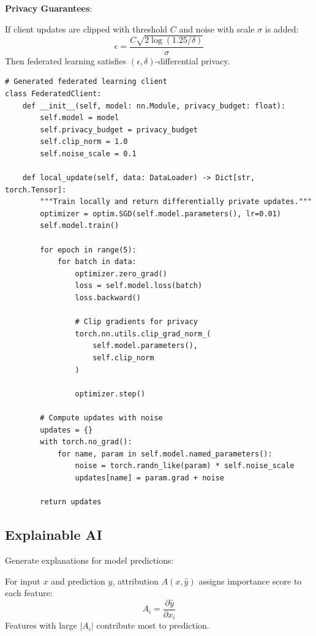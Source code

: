 \textbf{Privacy Guarantees}:

\begin{theorem}
    If client updates are clipped with threshold $C$ and noise with scale $\sigma$ is added:
    \begin{equation}
        \epsilon = \frac{C \sqrt{2 \log(1.25/\delta)}}{\sigma}
    \end{equation}
    Then federated learning satisfies $(\epsilon, \delta)$-differential privacy.
\end{theorem}

\begin{verbatim}
# Generated federated learning client
class FederatedClient:
    def __init__(self, model: nn.Module, privacy_budget: float):
        self.model = model
        self.privacy_budget = privacy_budget
        self.clip_norm = 1.0
        self.noise_scale = 0.1

    def local_update(self, data: DataLoader) -> Dict[str, torch.Tensor]:
        """Train locally and return differentially private updates."""
        optimizer = optim.SGD(self.model.parameters(), lr=0.01)
        self.model.train()

        for epoch in range(5):
            for batch in data:
                optimizer.zero_grad()
                loss = self.model.loss(batch)
                loss.backward()

                # Clip gradients for privacy
                torch.nn.utils.clip_grad_norm_(
                    self.model.parameters(),
                    self.clip_norm
                )

                optimizer.step()

        # Compute updates with noise
        updates = {}
        with torch.no_grad():
            for name, param in self.model.named_parameters():
                noise = torch.randn_like(param) * self.noise_scale
                updates[name] = param.grad + noise

        return updates
\end{verbatim}

\subsection{Explainable AI}

Generate explanations for model predictions:

\begin{definition}
    For input $x$ and prediction $\hat{y}$, attribution $A(x, \hat{y})$ assigns importance score to each feature:
    \begin{equation}
        A_i = \frac{\partial \hat{y}}{\partial x_i}
    \end{equation}
    Features with large $|A_i|$ contribute most to prediction.
\end{definition}

